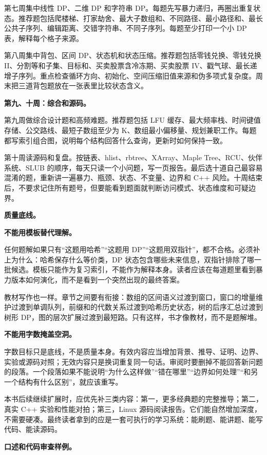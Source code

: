 第七周集中线性 DP、二维 DP 和字符串 DP。每题先写暴力递归，再圈出重复状态。推荐题包括爬楼梯、打家劫舍、最大子数组和、不同路径、最小路径和、最长公共子序列、编辑距离、交错字符串、不同子序列。每题至少打印一个小 DP 表，解释每个格子来源。

第八周集中背包、区间 DP、状态机和状态压缩。推荐题包括零钱兑换、零钱兑换 II、分割等和子集、目标和、买卖股票含冷冻期、买卖股票 IV、戳气球、最长递增子序列。重点检查循环方向、初始化、空间压缩旧值来源和伪多项式复杂度。周末把三道背包题放在一张表里比较状态含义。

\noindent\textbf{第九、十周：综合和源码。}

第九周做综合设计题和高频难题。推荐题包括 LFU 缓存、最大频率栈、时间键值存储、公交路线、最短子数组至少为 K、数组最小偏移量、规划兼职工作。每题都写索引组合图，说明每个结构回答什么查询，更新时如何保持一致。

第十周读源码和复盘。按链表、hlist、rbtree、XArray、Maple Tree、RCU、伙伴系统、SLUB 的顺序，每天只读一个小问题，写一页报告。最后选十道自己最容易混淆的题，重新讲一遍暴力、瓶颈、状态、不变量、边界和 C++ 风险。十周结束后，不要求记住所有题号，但要能看到题面就判断访问模式、状态维度和可疑边界。

\noindent\textbf{质量底线。}

\noindent\textbf{不能用模板替代理解。}

任何题解如果只有“这题用哈希”“这题用 DP”“这题用双指针”，都不合格。必须补上为什么：哈希保存什么等价类，DP 状态包含哪些未来信息，双指针排除了哪一批候选。模板只能作为复习索引，不能作为解释本身。读者应该在每道题里看到暴力版本如何演化，而不是看到一个突然出现的最终答案。

教材写作也一样。章节之间要有衔接：数组的区间语义过渡到窗口，窗口的增量维护过渡到单调队列，前缀和的代数关系过渡到哈希历史状态，树的后序汇总过渡到树形 DP，图的层次扩展过渡到最短路。只有这样，书才像教材，而不是题解堆。

\noindent\textbf{不能用字数掩盖空洞。}

字数目标只是底线，不是质量本身。有效内容应当增加背景、推导、证明、边界、实验或源码对照；无效内容只是换词重复同一句话。审阅时要删掉不能回答新问题的段落。一个段落如果不能说明“为什么这样做”“错在哪里”“边界如何处理”“和另一个结构有什么区别”，就应该重写。

本书后续继续扩展时，应优先补三类内容：第一，更多经典题的完整推导；第二，真实 C++ 实验和性能对拍；第三，Linux 源码阅读报告。它们能自然增加深度，不需要硬凑。最终读者拿到的应是一套可执行的学习系统：能刷题、能讲题、能写代码、能读源码。

\noindent\textbf{口述和代码审查样例。}

